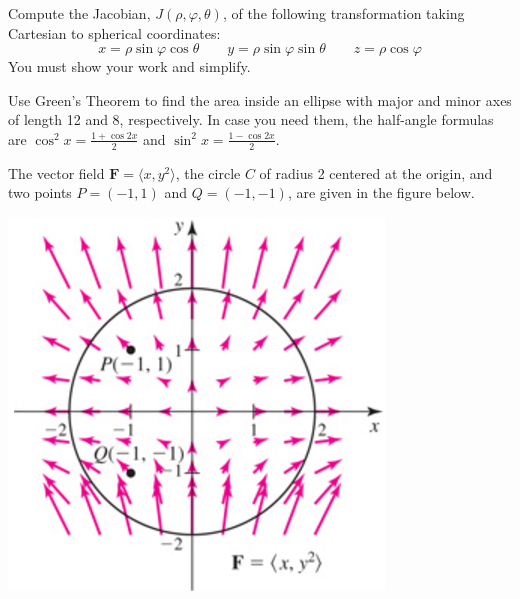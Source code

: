 \documentclass[12pt, addpoints]{exam/exam}
\newcommand{\vect}[1]{\mathbf{#1}}
\theoremstyle{plain}
\begin{document}
\begin{questions}
\thispagestyle{headandfoot}

\question[16] %
Compute the Jacobian, $J(\rho,\varphi,\theta)$, of the following transformation taking Cartesian to spherical coordinates:
\[
x = \rho \sin{\varphi}\cos{\theta} \qquad
y = \rho \sin{\varphi}\sin{\theta} \qquad
z = \rho \cos{\varphi}
\]
You must show your work and simplify.

\newpage

\question[16] %
Use Green's Theorem to find the area inside an ellipse with major and minor axes of length 
12 and 8, 
respectively.  In case you need them, the half-angle formulas are $\cos^2x=\frac{1+\cos{2x}}{2}$ and $\sin^2x=\frac{1-\cos{2x}}{2}$.

\newpage

\question %
The vector field $\vect F=\langle x,y^2\rangle$, the circle $C$ of radius 2 centered at the origin, and two points $P=(-1,1)$ and $Q=(-1,-1)$, are given in the figure below.

\vspace{-1pc}
\begin{center}
\includegraphics[scale=0.6]{14-5Exam3}
\end{center}

\end{questions}
\end{document}
